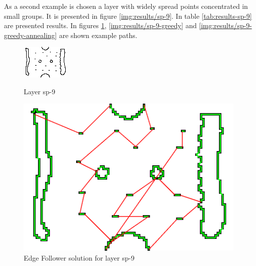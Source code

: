 \documentclass[titlepage]{article}
\newcommand{\multifigcaption}{\captionsetup{justification=justified}}
\begin{document}
As a second example is chosen a layer with widely spread points concentrated in small groups. It is presented in figure \ref{img:results/sp-9}. In table \ref{tab:results-sp-9} are presented results. In figures \ref{img:results/sp-9-ef}, \ref{img:results/sp-9-greedy} and \ref{img:results/sp-9-greedy-annealing} are shown example paths.

\begin{figure}[H]
	\begin{center}
		\begin{minipage}{.45\linewidth}
			\includegraphics[width=\textwidth]{img/results/sp-9.png}
			\multifigcaption
			\caption{Layer sp-9 \newline}
			\label{img:results/sp-9}
		\end{minipage}
		\hspace{.05\linewidth}
		\begin{minipage}{.45\linewidth}
			\includegraphics[width=\textwidth]{img/results/sp-9-ef-time.png}
			\multifigcaption
			\caption{Edge Follower solution for layer sp-9 }
			\label{img:results/sp-9-ef}
		\end{minipage}	
		
	\end{center}
\end{figure}
\end{document}
